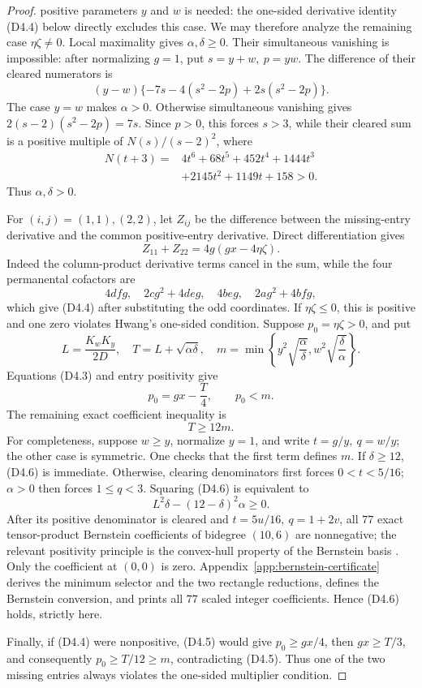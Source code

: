 \documentclass[10pt,a4paper]{amsart}
\theoremstyle{definition}
\theoremstyle{remark}
\begin{document}
\begin{proof}
positive parameters \(y\) and \(w\) is needed: the one-sided derivative
identity (D4.4) below directly excludes this case.  We may therefore analyze
the remaining case \(\eta\zeta\ne0\).  Local maximality gives
\(\alpha,\delta\geq0\).  Their simultaneous vanishing is impossible:
after normalizing \(g=1\), put \(s=y+w,\ p=yw\).  The difference of their
cleared numerators is
\[
(y-w)\{-7s-4(s^2-2p)+2s(s^2-2p)\}.
\]
The case \(y=w\) makes \(\alpha>0\).  Otherwise simultaneous vanishing gives
\(2(s-2)(s^2-2p)=7s\).  Since \(p>0\), this forces \(s>3\), while their
cleared sum is a positive multiple of \(N(s)/(s-2)^2\), where
\[
\begin{split}
N(t+3)={}&4t^6+68t^5+452t^4+1444t^3\\
&+2145t^2+1149t+158>0.
\end{split}
\]
Thus \(\alpha,\delta>0\).

For \((i,j)=(1,1),(2,2)\), let \(Z_{ij}\) be the difference between the
missing-entry derivative and the common positive-entry derivative.  Direct differentiation gives
\[
Z_{11}+Z_{22}=4g(gx-4\eta\zeta).                  \tag{D4.4}
\]
Indeed the column-product derivative terms cancel in the sum, while the
four permanental cofactors are
\[
4dfg,\quad 2cg^2+4deg,\quad 4beg,\quad 2ag^2+4bfg,
\]
which give (D4.4) after substituting the odd coordinates.
If \(\eta\zeta\leq0\), this is positive and one zero violates Hwang's
one-sided condition.  Suppose \(p_0=\eta\zeta>0\), and put
\[
L=\frac{K_wK_y}{2D},\quad T=L+\sqrt{\alpha\delta},\quad
m=\min\left\{y^2\sqrt{\frac\alpha\delta},
w^2\sqrt{\frac\delta\alpha}\right\}.
\]
Equations (D4.3) and entry positivity give
\[
p_0=gx-\frac T4,\qquad p_0<m.                     \tag{D4.5}
\]
The remaining exact coefficient inequality is
\[
T\geq12m.                                         \tag{D4.6}
\]
For completeness, suppose \(w\geq y\), normalize \(y=1\), and write
\(t=g/y,\ q=w/y\); the other case is symmetric.  One checks that the first
term defines \(m\).  If \(\delta\geq12\), (D4.6) is immediate.  Otherwise,
clearing denominators first forces \(0<t<5/16\); \(\alpha>0\) then forces
\(1\leq q<3\).  Squaring (D4.6) is equivalent to
\[
L^2\delta-(12-\delta)^2\alpha\geq0.               \tag{D4.7}
\]
After its positive denominator is cleared and
\(t=5u/16,\ q=1+2v\), all \(77\) exact tensor-product Bernstein
coefficients of bidegree \((10,6)\) are nonnegative; the relevant positivity
principle is the convex-hull property of the Bernstein basis
\cite{Farouki}.  Only the coefficient
at \((0,0)\) is zero.  Appendix~\ref{app:bernstein-certificate}
derives the minimum selector and the two rectangle reductions, defines the
Bernstein conversion, and prints all \(77\) scaled integer coefficients.
Hence (D4.6) holds, strictly here.

Finally, if (D4.4) were nonpositive, (D4.5) would give
\(p_0\geq gx/4\), then \(gx\geq T/3\), and consequently
\(p_0\geq T/12\geq m\), contradicting (D4.5).  Thus one of the two missing
entries always violates the one-sided multiplier condition.
\end{proof}
\end{document}
